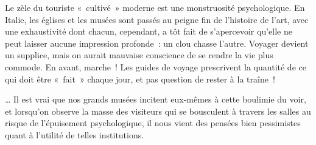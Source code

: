 \documentclass[11pt,twoside,openany]{book}
\newenvironment{lateiDocument}{}{}
\begin{document}
\begin{lateiDocument}
\begin{teiElement}[name={TEI},change={commons\_edition}]
\begin{teiElement}[name={text},type={book},xmlid={book}]
\begin{teiElement}[name={group},type={book},xmlid={book-001}]
\begin{teiElement}[name={group},type={section1},xmlid={section1-001}]
\begin{teiElement}
\begin{teiElement}[name={body},xmlid={body-005}]
\begin{teiDiv}[type={section1},xmlid={div03-2}]
\begin{teiCit}[xmlid={cit05-2}]
                \begin{teiQuote}
Le zèle du touriste « cultivé » moderne est une monstruosité psychologique. En Italie, les églises et les musées sont passés au peigne fin de l’histoire de l’art, avec une exhaustivité dont chacun, cependant, a tôt fait de s’apercevoir qu’elle ne peut laisser aucune impression profonde : un clou chasse l’autre. Voyager devient un supplice, mais on aurait mauvaise conscience de se rendre la vie plus commode. En avant, marche ! Les guides de voyage prescrivent la quantité de ce qui doit être « fait » chaque jour, et pas question de rester à la traîne !
\end{teiQuote}
              
\end{teiCit}
              \begin{teiCit}[xmlid={cit06-2}]

                \begin{teiQuote}
\lbrack{}…\rbrack{} Il est vrai que nos grands musées incitent eux-mêmes à cette boulimie du voir, et lorsqu’on observe la masse des visiteurs qui se bousculent à travers les salles au risque de l’épuisement psychologique, il nous vient des pensées bien pessimistes quant à l’utilité de telles institutions.
\end{teiQuote}
              

\end{teiCit}
\end{teiDiv}
\end{teiElement}
\end{teiElement}
\end{teiElement}
\end{teiElement}
\end{teiElement}
\end{teiElement}
\end{lateiDocument}
\end{document}
